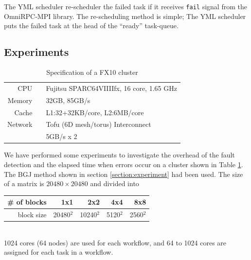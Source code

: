 \documentclass[graybox]{svmult}
\begin{document}
The YML scheduler re-scheduler the failed task if it receives {\tt fail} signal from the OmniRPC-MPI library. 
The re-scheduling method is simple; The YML scheduler puts the failed task at the head of the ``ready'' task-queue. 

\subsection{Experiments}

\begin{table}[t]
\begin{center}
 \caption{Specification of a FX10 cluster}
\label{table:fx10-spec}
\begin{tabular}[t]{rrl}\hline\hline
 CPU & &Fujitsu SPARC64VIIIIfx, 16 core, 1.65 GHz\\
Memory && 32GB, 85GB/s \\
Cache  && L1:32+32KB/core,  L2:6MB/core \\
Network & & Tofu (6D mesh/torus) Interconnect \\
        & & 5GB/s x 2 \\\hline
\end{tabular}
\end{center}
\end{table}


We have performed some experiments to investigate the overhead of the fault detection and the elapsed time when errors occur on a cluster shown in Table \ref{table:fx10-spec}.
The BGJ method shown in section \ref{section:experiment} had been used.
The size of a matrix is $20480\times 20480$ and divided into \\
\hspace*{20mm}
\begin{tabular}[t]{r|r|r|r|r}\hline\hline
\# of blocks  & 1x1 & 2x2 & 4x4& 8x8\\\hline
block size    & 20480$^2$ & 10240$^2$ & 5120$^2$ & 2560$^2$\\\hline
\end{tabular}\\
1024 cores (64 nodes) are used for each workflow, and 64 to 1024 cores are assigned for each task in a workflow. 
\end{document}
